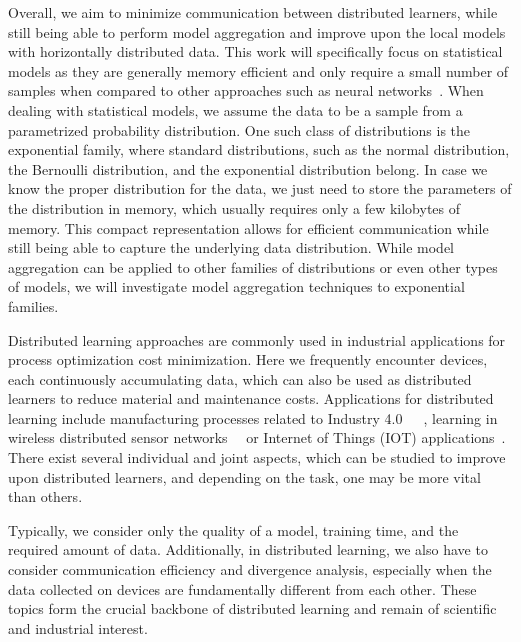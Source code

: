 Overall, we aim to minimize communication between distributed learners, while still being able to perform model aggregation and improve upon the local models with horizontally distributed data.
This work will specifically focus on statistical models as they are generally memory efficient and only require a small number of samples when compared to other approaches such as neural networks~\cite{bartlett1998sample}. 
When dealing with statistical models, we assume the data to be a sample from a parametrized probability distribution.
One such class of distributions is the exponential family, where standard distributions, such as the normal distribution,  the Bernoulli distribution, and the exponential distribution belong.
In case we know the proper distribution for the data, we just need to store the parameters of the distribution in memory, which usually requires only a few kilobytes of memory.
This compact representation allows for efficient communication while still being able to capture the underlying data distribution.
While model aggregation can be applied to other families of distributions or even other types of models, we will investigate model aggregation techniques \wrt to exponential families.


Distributed learning approaches are commonly used in industrial applications for process optimization cost minimization. 
Here we frequently encounter devices, each continuously accumulating data, which can also be used as distributed learners to reduce material and maintenance costs.
Applications for distributed learning include manufacturing processes related to Industry 4.0~\cite{kreitlein2015green}~\cite{guglielmino2001moving}~\cite{faller2015industry}, learning in wireless distributed sensor networks~\cite{maleki2010energy}~\cite{predd2006distributed} or Internet of Things (IOT) applications~\cite{roman2013features}.
There exist several individual and joint aspects, which can be studied to improve upon distributed learners, and depending on the task, one may be more vital than others.

Typically, we consider only the quality of a model, training time, and the required amount of data. 
Additionally, in distributed learning, we also have to consider communication efficiency and divergence analysis, especially when the data collected on devices are fundamentally different from each other.
These topics form the crucial backbone of distributed learning and remain of scientific and industrial interest.

